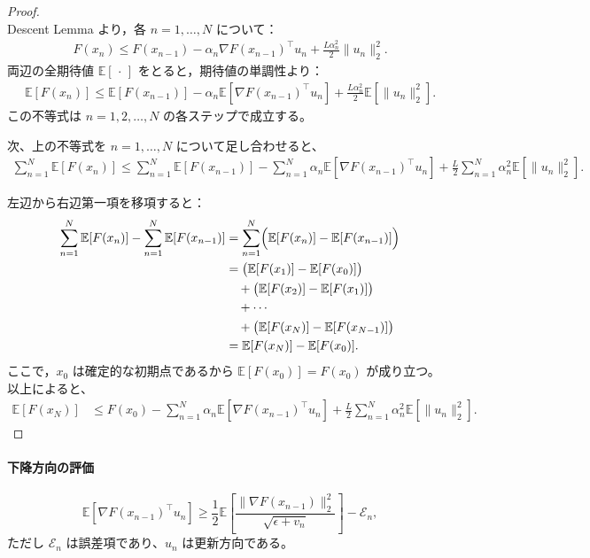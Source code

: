 \documentclass[dvipdfmx,a4paper,11pt]{jsarticle}
\begin{document}
\begin{proof}\ \\
\noindent
Descent Lemma より，各 $n = 1, \dots, N$ について：
\begin{align}
    F(x_n) \leq F(x_{n-1}) - \alpha_n \nabla F(x_{n-1})^\top u_n + \frac{L\alpha_n^2}{2}\|u_n\|_2^2.
\end{align}
両辺の全期待値 $\mathbb{E}[\,\cdot\,]$ をとると，期待値の単調性より：
\begin{align}
    \mathbb{E}[F(x_n)]
    \leq \mathbb{E}[F(x_{n-1})]
    - \alpha_n \mathbb{E}[\nabla F(x_{n-1})^\top u_n]
    + \frac{L\alpha_n^2}{2} \mathbb{E}[\|u_n\|_2^2].
\end{align}
この不等式は $n = 1, 2, \dots, N$ の各ステップで成立する。

次、上の不等式を $n = 1, \dots, N$ について足し合わせると、
\begin{align}
    \sum_{n=1}^N \mathbb{E}[F(x_n)]
    \leq \sum_{n=1}^N \mathbb{E}[F(x_{n-1})]
    - \sum_{n=1}^N \alpha_n \mathbb{E}[\nabla F(x_{n-1})^\top u_n]
    + \frac{L}{2} \sum_{n=1}^N \alpha_n^2 \mathbb{E}[\|u_n\|_2^2].
\end{align}


左辺から右辺第一項を移項すると：
\begin{align}
    \sum_{n=1}^N \mathbb{E}[F(x_n)] - \sum_{n=1}^N \mathbb{E}[F(x_{n-1})]
    &= \sum_{n=1}^N \Bigl(\mathbb{E}[F(x_n)] - \mathbb{E}[F(x_{n-1})]\Bigr) \notag \\
    &= \bigl(\mathbb{E}[F(x_1)] - \mathbb{E}[F(x_0)]\bigr) \notag \\
    &\quad + \bigl(\mathbb{E}[F(x_2)] - \mathbb{E}[F(x_1)]\bigr) \notag \\
    &\quad + \cdots \notag \\
    &\quad + \bigl(\mathbb{E}[F(x_N)] - \mathbb{E}[F(x_{N-1})]\bigr) \notag \\
    &= \mathbb{E}[F(x_N)] - \mathbb{E}[F(x_0)].
\end{align}
ここで，$x_0$ は確定的な初期点であるから $\mathbb{E}[F(x_0)] = F(x_0)$ が成り立つ。
\noindent
以上によると、
\begin{align}
    \mathbb{E}[F(x_N)]
    &\leq F(x_0)
    - \sum_{n=1}^N \alpha_n
      \mathbb{E}[\nabla F(x_{n-1})^\top u_n]
    + \frac{L}{2}\sum_{n=1}^N \alpha_n^2
      \mathbb{E}[\|u_n\|_2^2]. \tag{52}
\end{align}
\end{proof}
\paragraph{下降方向の評価}
\begin{equation}
    \mathbb{E}[\nabla F(x_{n-1})^\top u_n]
    \geq \frac{1}{2}
    \mathbb{E}\!\left[
        \frac{\|\nabla F(x_{n-1})\|_2^2}{\sqrt{\epsilon + v_n}}
    \right]
    - \mathcal{E}_n,
\end{equation}
ただし $\mathcal{E}_n$ は誤差項であり、$u_n$ は更新方向である。
\end{document}
